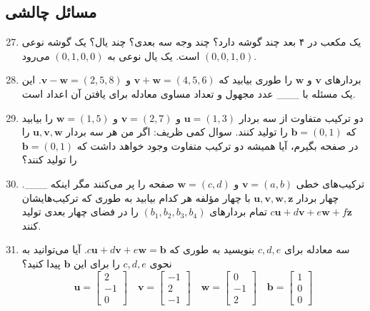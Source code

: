 \documentclass[12pt, a4paper]{book}
\begin{document}
	\subsection*{مسائل چالشی}
	\begin{enumerate}
		\setcounter{enumi}{26}
		\item یک مکعب در ۴ بعد چند گوشه دارد؟ چند وجه سه بعدی؟ چند یال؟ یک گوشه نوعی $(0,0,1,0)$ است. یک یال نوعی به $(0,1,0,0)$ می‌رود.
		\item بردارهای $\mathbf{v}$ و $\mathbf{w}$ را طوری بیابید که $\mathbf{v}+\mathbf{w}=(4,5,6)$ و $\mathbf{v}-\mathbf{w}=(2,5,8)$. این یک مسئله با \_\_\_ عدد مجهول و تعداد مساوی معادله برای یافتن آن اعداد است.
		\item دو ترکیب متفاوت از سه بردار $\mathbf{u}=(1,3)$ و $\mathbf{v}=(2,7)$ و $\mathbf{w}=(1,5)$ را بیابید که $\mathbf{b}=(0,1)$ را تولید کنند. سوال کمی ظریف: اگر من هر سه بردار $\mathbf{u,v,w}$ را در صفحه بگیرم، آیا همیشه دو ترکیب متفاوت وجود خواهد داشت که $\mathbf{b}=(0,1)$ را تولید کنند؟
		\item ترکیب‌های خطی $\mathbf{v}=(a,b)$ و $\mathbf{w}=(c,d)$ صفحه را پر می‌کنند مگر اینکه \_\_\_.
		\ چهار بردار $\mathbf{u,v,w,z}$ با چهار مؤلفه هر کدام بیابید به طوری که ترکیب‌هایشان $c\mathbf{u}+d\mathbf{v}+e\mathbf{w}+f\mathbf{z}$ تمام بردارهای $(b_1,b_2,b_3,b_4)$ را در فضای چهار بعدی تولید کنند.
		\item سه معادله برای $c,d,e$ بنویسید به طوری که $c\mathbf{u}+d\mathbf{v}+e\mathbf{w}=\mathbf{b}$. آیا می‌توانید به نحوی $c,d,e$ را برای این $\mathbf{b}$ پیدا کنید؟
		\[ \mathbf{u} = \begin{bmatrix} 2 \\ -1 \\ 0 \end{bmatrix} \quad \mathbf{v} = \begin{bmatrix} -1 \\ 2 \\ -1 \end{bmatrix} \quad \mathbf{w} = \begin{bmatrix} 0 \\ -1 \\ 2 \end{bmatrix} \quad \mathbf{b} = \begin{bmatrix} 1 \\ 0 \\ 0 \end{bmatrix} \]
	\end{enumerate}
	
\end{document}
